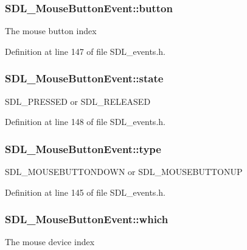 \subsubsection[{button}]{ S\+D\+L\+\_\+\+Mouse\+Button\+Event\+::button}\label{struct_s_d_l___mouse_button_event_a1a4680e19ae06d02d2093f0bcba1b24c}
The mouse button index 

Definition at line 147 of file S\+D\+L\+\_\+events.\+h.

\hypertarget{struct_s_d_l___mouse_button_event_a8809cef85cfffad4f2059f2ba4fc6a3d}{}
\subsubsection[{state}]{ S\+D\+L\+\_\+\+Mouse\+Button\+Event\+::state}\label{struct_s_d_l___mouse_button_event_a8809cef85cfffad4f2059f2ba4fc6a3d}
S\+D\+L\+\_\+\+P\+R\+E\+S\+S\+E\+D or S\+D\+L\+\_\+\+R\+E\+L\+E\+A\+S\+E\+D 

Definition at line 148 of file S\+D\+L\+\_\+events.\+h.

\hypertarget{struct_s_d_l___mouse_button_event_a529beaceaf87d55792af53fa48d34c4b}{}
\subsubsection[{type}]{ S\+D\+L\+\_\+\+Mouse\+Button\+Event\+::type}\label{struct_s_d_l___mouse_button_event_a529beaceaf87d55792af53fa48d34c4b}
S\+D\+L\+\_\+\+M\+O\+U\+S\+E\+B\+U\+T\+T\+O\+N\+D\+O\+W\+N or S\+D\+L\+\_\+\+M\+O\+U\+S\+E\+B\+U\+T\+T\+O\+N\+U\+P 

Definition at line 145 of file S\+D\+L\+\_\+events.\+h.

\hypertarget{struct_s_d_l___mouse_button_event_af8fca7f59b8a6e3eeab6b54c494e58b7}{}
\subsubsection[{which}]{ S\+D\+L\+\_\+\+Mouse\+Button\+Event\+::which}\label{struct_s_d_l___mouse_button_event_af8fca7f59b8a6e3eeab6b54c494e58b7}
The mouse device index 

